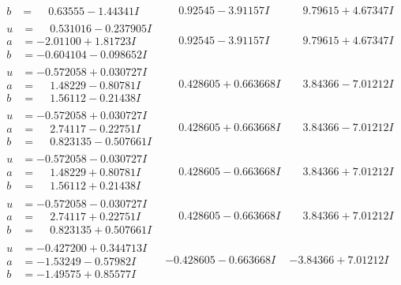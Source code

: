 \documentclass[1p]{elsarticle_modified}
\theoremstyle{definition}
\begin{document}
$$\begin{array}{c|c|c}
\begin{aligned}
b &= \phantom{-}0.63555 - 1.44341 I\end{aligned}
 & \phantom{-}0.92545 - 3.91157 I & \phantom{-}9.79615 + 4.67347 I \\ \hline\begin{aligned}
u &= \phantom{-}0.531016 - 0.237905 I \\
a &= -2.01100 + 1.81723 I \\
b &= -0.604104 - 0.098652 I\end{aligned}
 & \phantom{-}0.92545 - 3.91157 I & \phantom{-}9.79615 + 4.67347 I \\ \hline\begin{aligned}
u &= -0.572058 + 0.030727 I \\
a &= \phantom{-}1.48229 - 0.80781 I \\
b &= \phantom{-}1.56112 - 0.21438 I\end{aligned}
 & \phantom{-}0.428605 + 0.663668 I & \phantom{-}3.84366 - 7.01212 I \\ \hline\begin{aligned}
u &= -0.572058 + 0.030727 I \\
a &= \phantom{-}2.74117 - 0.22751 I \\
b &= \phantom{-}0.823135 - 0.507661 I\end{aligned}
 & \phantom{-}0.428605 + 0.663668 I & \phantom{-}3.84366 - 7.01212 I \\ \hline\begin{aligned}
u &= -0.572058 - 0.030727 I \\
a &= \phantom{-}1.48229 + 0.80781 I \\
b &= \phantom{-}1.56112 + 0.21438 I\end{aligned}
 & \phantom{-}0.428605 - 0.663668 I & \phantom{-}3.84366 + 7.01212 I \\ \hline\begin{aligned}
u &= -0.572058 - 0.030727 I \\
a &= \phantom{-}2.74117 + 0.22751 I \\
b &= \phantom{-}0.823135 + 0.507661 I\end{aligned}
 & \phantom{-}0.428605 - 0.663668 I & \phantom{-}3.84366 + 7.01212 I \\ \hline\begin{aligned}
u &= -0.427200 + 0.344713 I \\
a &= -1.53249 - 0.57982 I \\
b &= -1.49575 + 0.85577 I\end{aligned}
 & -0.428605 - 0.663668 I & -3.84366 + 7.01212 I \\ \hline\begin{aligned}

\end{aligned}
\end{array}$$
\end{document}

